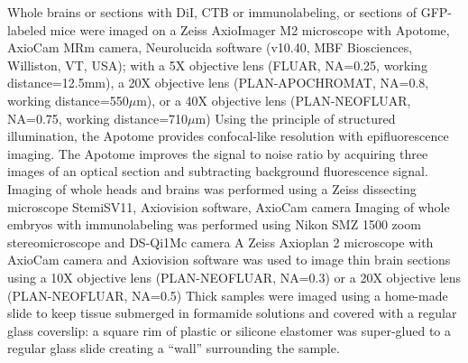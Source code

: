 Whole brains or sections with DiI, CTB or immunolabeling, or sections of GFP-labeled mice were imaged on a Zeiss AxioImager M2 microscope with Apotome, AxioCam MRm camera, Neurolucida software (v10.40, MBF Biosciences, Williston, VT, USA); with a 5X objective lens (FLUAR, NA=0.25, working distance=12.5mm), a 20X objective lens (PLAN-APOCHROMAT, NA=0.8, working distance=550$\mu$m), or a 40X objective lens (PLAN-NEOFLUAR, NA=0.75, working distance=710$\mu$m) %
Using the principle of structured illumination, the Apotome provides confocal-like resolution with epifluorescence imaging.
The Apotome improves the signal to noise ratio by acquiring three images of an optical section and subtracting background fluorescence signal.
Imaging of whole heads and brains was performed using a Zeiss dissecting microscope StemiSV11, Axiovision software, AxioCam camera %
Imaging of whole embryos with immunolabeling was performed using Nikon SMZ 1500 zoom stereomicroscope and DS-Qi1Mc camera %
A Zeiss Axioplan 2 microscope with AxioCam camera and Axiovision software was used to image thin brain sections using a 10X objective lens (PLAN-NEOFLUAR, NA=0.3) or a 20X objective lens (PLAN-NEOFLUAR, NA=0.5) %
Thick samples were imaged using a home-made slide to keep tissue submerged in formamide solutions and covered with a regular glass coverslip: a square rim of plastic or silicone elastomer was super-glued to a regular glass slide creating a ``wall'' surrounding the sample.
